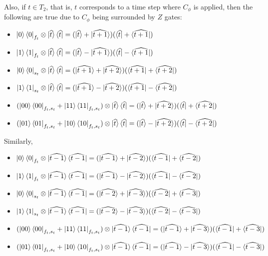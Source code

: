 \documentclass{article}
\theoremstyle{definition}
\begin{document}
Also, if $t\in T_2$, that is, $t$ corresponds to a time step where $C_\phi$ is applied, then the following are true due to $C_\phi$ being surrounded by $Z$ gates:
\begin{itemize}
	\item $\ket{0}\bra{0}_{f_t}\otimes
		\ket{\widehat{t}}\bra{\widehat{t}}
		=(\ket{\widehat{t}}+\ket{\widehat{t+1}})
		(\bra{\widehat{t}}+\bra{\widehat{t+1}})$
	\item $\ket{1}\bra{1}_{f_t}\otimes
		\ket{\widehat{t}}\bra{\widehat{t}}
		=(\ket{\widehat{t}}-\ket{\widehat{t+1}})
		(\bra{\widehat{t}}-\bra{\widehat{t+1}})$
	\item $\ket{0}\bra{0}_{s_t}\otimes
		\ket{\widehat{t}}\bra{\widehat{t}}
		=(\ket{\widehat{t+1}}+\ket{\widehat{t+2}})
		(\bra{\widehat{t+1}}+\bra{\widehat{t+2}})$
	\item $\ket{1}\bra{1}_{s_t}\otimes
		\ket{\widehat{t}}\bra{\widehat{t}}
		=(\ket{\widehat{t+1}}-\ket{\widehat{t+2}})
		(\bra{\widehat{t+1}}-\bra{\widehat{t+2}})$
	\item $(\ket{00}\bra{00}_{f_t,s_t}
		+\ket{11}\bra{11}_{f_t,s_t})\otimes
		\ket{\widehat{t}}\bra{\widehat{t}}
		=(\ket{\widehat{t}}+\ket{\widehat{t+2}})
		(\bra{\widehat{t}}+\bra{\widehat{t+2}})$
	\item $(\ket{01}\bra{01}_{f_t,s_t}
		+\ket{10}\bra{10}_{f_t,s_t})\otimes
		\ket{\widehat{t}}\bra{\widehat{t}}
		=(\ket{\widehat{t}}-\ket{\widehat{t+2}})
		(\bra{\widehat{t}}-\bra{\widehat{t+2}})$
\end{itemize}

Similarly,
\begin{itemize}
	\item $\ket{0}\bra{0}_{f_t}\otimes
		\ket{\widehat{t-1}}\bra{\widehat{t-1}}
		=(\ket{\widehat{t-1}}+\ket{\widehat{t-2}})
		(\bra{\widehat{t-1}}+\bra{\widehat{t-2}})$
	\item $\ket{1}\bra{1}_{f_t}\otimes
		\ket{\widehat{t-1}}\bra{\widehat{t-1}}
		=(\ket{\widehat{t-1}}-\ket{\widehat{t-2}})
		(\bra{\widehat{t-1}}-\bra{\widehat{t-2}})$
	\item $\ket{0}\bra{0}_{s_t}\otimes
		\ket{\widehat{t-1}}\bra{\widehat{t-1}}
		=(\ket{\widehat{t-2}}+\ket{\widehat{t-3}})
		(\bra{\widehat{t-2}}+\bra{\widehat{t-3}})$
	\item $\ket{1}\bra{1}_{s_t}\otimes
		\ket{\widehat{t-1}}\bra{\widehat{t-1}}
		=(\ket{\widehat{t-2}}-\ket{\widehat{t-3}})
		(\bra{\widehat{t-2}}-\bra{\widehat{t-3}})$
	\item $(\ket{00}\bra{00}_{f_t,s_t}
		+\ket{11}\bra{11}_{f_t,s_t})\otimes
		\ket{\widehat{t-1}}\bra{\widehat{t-1}}
		=(\ket{\widehat{t-1}}+\ket{\widehat{t-3}})
		(\bra{\widehat{t-1}}+\bra{\widehat{t-3}})$
	\item $(\ket{01}\bra{01}_{f_t,s_t}
		+\ket{10}\bra{10}_{f_t,s_t})\otimes
		\ket{\widehat{t-1}}\bra{\widehat{t-1}}
		=(\ket{\widehat{t-1}}-\ket{\widehat{t-3}})
		(\bra{\widehat{t-1}}-\bra{\widehat{t-3}})$
\end{itemize}
\end{document}

